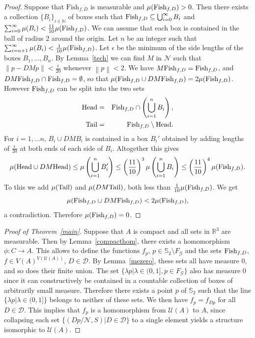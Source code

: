 \documentclass{lmcs}
\def\fish{\mbox{\rm Fish}}
\def\head{\mbox{\rm Head}}
\def\tail{\mbox{\rm Tail}}
\begin{document}
\begin{proof}
Suppose that $\mbox{Fish}_{f,D}$ is measurable and $\mu(\fish_{f,D}) > 0$. Then there exists a collection 
$\{ B_i \}_{i \in \mathbb{N}}$ of boxes such that $\fish_{f,D} \subseteq \bigcup_{i=0}^{\infty} B_i$ and 
$\sum_{i=0}^{\infty} \mu(B_i) < \frac{11}{10} \mu(\fish_{f,D})$. We can assume
that each box is contained in the ball of radius 2 around the origin.
Let $n$ be an integer such that $\sum_{i=n+1}^{\infty} \mu(B_i) < \frac{1}{10} \mu(\fish_{f,D})$. 
Let $\epsilon$ be the minimum of the side lengths of the boxes $B_1, \ldots, B_n$.
By Lemma~\ref{tech} we can find $M$ in $\mathcal{N}$ such that $\left \lVert p - D M p \right \rVert < \frac{\epsilon}{20}$
whenever $\left\lVert p \right\rVert < 2$. We have $M \fish_{f,D} = \fish_{f,D}$,
and $D  M  \fish_{f,D} \cap \fish_{f,D} = \emptyset$, so that 
$\mu(\fish_{f,D} \cup D  M  \fish_{f,D}) = 2\mu(\fish_{f,D})$. 
However $\fish_{f,D}$ can be split into the two sets 
\begin{eqnarray*}
\head & = & \fish_{f,D} \cap \left ( \bigcup_{i=1}^n B_i \right ), \\
\tail & = & \fish_{f,D} \setminus \head. 
\end{eqnarray*}
For $i = 1, \ldots n$, $B_i \cup D M B_i$ is contained in a box $B_i'$
obtained by adding lengths of $\frac{\epsilon}{20}$ at both ends of each side of $B_i$. Altogether this gives 
$$
\mu(\head \cup D M \head) \leq
\mu\left ( \bigcup_{i=1}^n B_i' \right )
\leq \left ( \frac{11}{10} \right )^3 
\mu\left ( \bigcup_{i=1}^n B_i \right )
\leq \left ( \frac{11}{10} \right )^4 \mu(\fish_{f,D}).
$$
To this we add $\mu(\tail)$ and $\mu(D M \tail)$, both less than 
$\frac{1}{10} \mu(\fish_{f,D})$.
We get  
$$\mu(\fish_{f,D} \cup D M \fish_{f,D}) < 2\mu(\fish_{f,D}),$$ 
a contradiction. 
Therefore $\mu(\fish_{f,D}) = 0$.
\end{proof}

\begin{proof}[Proof of Theorem~\ref{main}] 
Suppose that $A$ is compact and all sets in $\mathbb{R}^3$
are measurable. Then by Lemma~\ref{compacthom},
there exists a homomorphism $\phi: C \rightarrow A$.
This allows to define the functions $f_p$, 
$p \in \mathbb{S}_2\setminus F_\mathcal{G}$
and the sets $\fish_{f,D}$, $f \in V(A)^{V(\mathcal{U}(A))}$, 
$D \in \mathcal{D}$.
By Lemma~\ref{mezero}, these sets all have measure $0$,
and so does their finite union.
The set $\{\lambda p | \lambda \in (0,1], p \in F_{\mathcal{G}}\}$
also has measure $0$ since it can constructively be contained
in a countable collection of boxes of arbitrarily small measure.
Therefore there exists a point $p$ of $\mathbb{S}_2$ 
such that the line $\{\lambda p | \lambda \in (0,1]\}$ 
belongs to neither of these sets.
We then have $f_p = f_{D p}$ for all $D \in \mathcal{D}$. This implies that $f_p$ is a homomorphism
from $\mathcal{U}(A)$ to $A$, since collapsing each set 
$\{ (D p/\mathcal{N},S) | D \in \mathcal{D} \}$ to a single 
element yields a structure isomorphic to $\mathcal{U}(A)$.
\end{proof}
\end{document}
